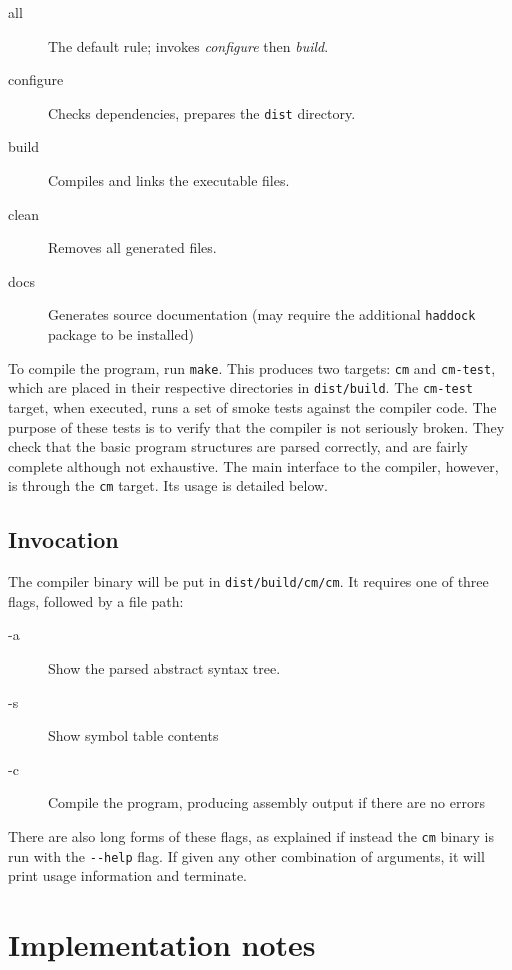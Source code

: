 \documentclass[12pt]{amsart}
\begin{document}
\begin{description}
\item[all] The default rule; invokes \emph{configure} then
  \emph{build}. 
\item[configure] Checks dependencies, prepares the \verb|dist| directory.
\item[build] Compiles and links the executable files.
\item[clean] Removes all generated files.
\item[docs] Generates source documentation (may require the additional
  \verb|haddock| package to be installed)
\end{description}

To compile the program, run \verb|make|. This produces two targets:
\verb|cm| and \verb|cm-test|, which are placed in their respective
directories in \verb|dist/build|. The \verb|cm-test| target, when
executed, runs a set of smoke tests against the compiler code. The
purpose of these tests is to verify that the compiler is not seriously
broken. They check that the basic program structures are parsed
correctly, and are fairly complete although not exhaustive. The main
interface to the compiler, however, is through the \verb|cm|
target. Its usage is detailed below.

\subsection{Invocation}
The compiler binary will be put in \verb|dist/build/cm/cm|. It
requires one of three flags, followed by a file path:

\begin{description}
\item[-a] Show the parsed abstract syntax tree.
\item[-s] Show symbol table contents
\item[-c] Compile the program, producing assembly output if there are
  no errors
\end{description}

There are also long forms of these flags, as explained if instead the
\verb|cm| binary is run with the \verb|--help| flag. If given any
other combination of arguments, it will print usage information and
terminate.


\section{Implementation notes}
\label{implementation}
\end{document}
